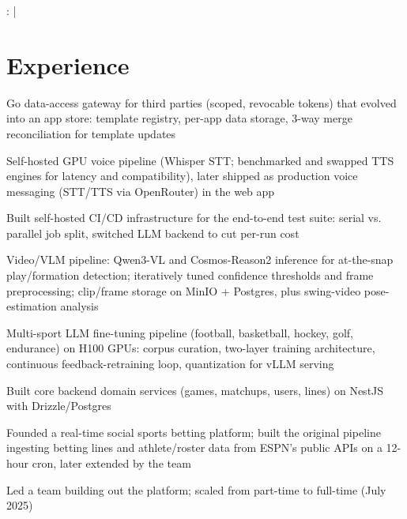 \documentclass[]{jack-resume}
\begin{document}
\raggedright{
    :
      \href{https://www.linkedin.com/in/jack-sturtevant/}{ \ExternalLink} |
     \href{https://github.com/jacksturt}{ \ExternalLink}}


\section{Experience}

\begin{tightemize}
    \item Go data-access gateway for third parties (scoped, revocable tokens) that evolved into an app store: template registry, per-app data storage, 3-way merge reconciliation for template updates
    \item Self-hosted GPU voice pipeline (Whisper STT; benchmarked and swapped TTS engines for latency and compatibility), later shipped as production voice messaging (STT/TTS via OpenRouter) in the web app
    \item Built self-hosted CI/CD infrastructure for the end-to-end test suite: serial vs. parallel job split, switched LLM backend to cut per-run cost
    \item Video/VLM pipeline: Qwen3-VL and Cosmos-Reason2 inference for at-the-snap play/formation detection; iteratively tuned confidence thresholds and frame preprocessing; clip/frame storage on MinIO + Postgres, plus swing-video pose-estimation analysis
    \item Multi-sport LLM fine-tuning pipeline (football, basketball, hockey, golf, endurance) on H100 GPUs: corpus curation, two-layer training architecture, continuous feedback-retraining loop, quantization for vLLM serving
\end{tightemize}
\sectionsep

\begin{tightemize}
    \item Built core backend domain services (games, matchups, users, lines) on NestJS with Drizzle/Postgres
    \item Founded a real-time social sports betting platform; built the original pipeline ingesting betting lines and athlete/roster data from ESPN's public APIs on a 12-hour cron, later extended by the team
    \item Led a team building out the platform; scaled from part-time to full-time (July 2025)
\end{tightemize}
\sectionsep
\end{document}
